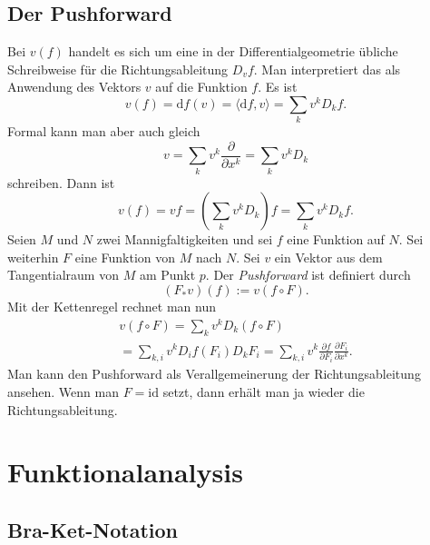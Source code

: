 \documentclass[a4paper,10pt,fleqn,twocolumn,twoside]{article}
\numberwithin{equation}{section}
\begin{document}
\subsection{Der Pushforward}

Bei $v(f)$ handelt es sich um eine in der Differentialgeometrie
übliche Schreibweise für die Richtungsableitung $D_v f$. Man
interpretiert das als Anwendung des Vektors $v$ auf die Funktion
$f$. Es ist
\begin{equation}
v(f) = \mathrm df(v) = \langle\mathrm df,v\rangle
= \sum_k v^k D_k f.
\end{equation}
Formal kann man aber auch gleich
\begin{equation}
v=\sum_k v^k\frac{\partial}{\partial x^k} = \sum_k v^k D_k
\end{equation}
schreiben. Dann ist
\begin{equation}
v(f) = vf = (\sum_k v^k D_k)f = \sum_k v^k D_k f.
\end{equation}
%
Seien $M$ und $N$ zwei Mannigfaltigkeiten und sei $f$ eine
Funktion auf $N$. Sei weiterhin $F$ eine Funktion von $M$ nach
$N$. Sei $v$ ein Vektor aus dem Tangentialraum von $M$ am Punkt
$p$. Der \textit{Pushforward} ist definiert durch
\begin{equation}
(F_\ast v)(f) := v(f\circ F).
\end{equation}
Mit der Kettenregel rechnet man nun
\begin{gather*}
v(f\circ F) = \sum_k v^k D_k(f\circ F)\\
= \sum_{k,i} v^k D_i f(F_i)D_k F_i
= \sum_{k,i} v^k \frac{\partial f}{\partial F_i}
\frac{\partial F_i}{\partial x^k}.
\end{gather*}
Man kann den Pushforward als Verallgemeinerung der Richtungsableitung
ansehen. Wenn man $F=\mathrm{id}$ setzt, dann erhält man ja wieder
die Richtungsableitung.



\section{Funktionalanalysis}

\subsection{Bra-Ket-Notation}
\end{document}
